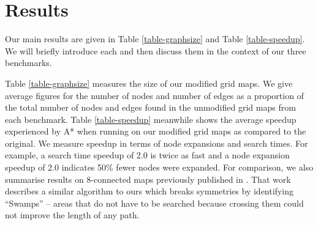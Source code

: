 \section{Results}
\label{sec-results}



Our main results are given in Table \ref{table-graphsize} and Table
\ref{table-speedup}.
We will briefly introduce each and then discuss them in the context
of our three benchmarks.
\par
Table \ref{table-graphsize} measures the size of our modified grid maps.
We give average figures for the number of nodes and number of edges
as a proportion of the total number of nodes and edges found in the 
unmodified grid maps from each benchmark. 
Table \ref{table-speedup} meanwhile shows the average speedup experienced
by A* when running on our modified grid maps as compared to the
original.  We measure speedup in terms of node expansions and search
times.  For example, a search time speedup of 2.0 is twice as fast and
a node expansion speedup of 2.0 indicates 50\% fewer nodes were expanded.
For comparison, we also summarise results on 8-connected maps previously published in \cite{pochter10}.
That work describes a similar algorithm to ours which breaks symmetries by identifying ``Swamps'' --
areas that do not have to be searched because crossing them could not improve the length of any path.
 
